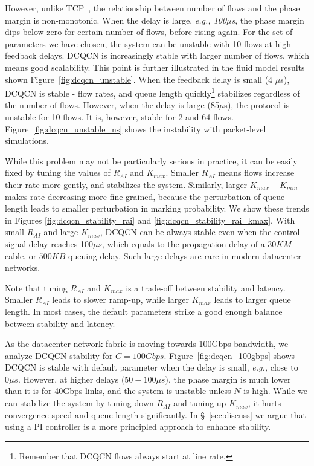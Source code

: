 However, unlike TCP~\cite{misra2000fluid}, the relationship between number of
flows and the phase margin is non-monotonic. When the delay is large, {\em e.g.,
100$\mu$s}, the phase margin dips below zero for certain number of flows, before
rising again.  For the set of parameters we have chosen, the system can be
unstable with 10 flows at high feedback delays.  DCQCN is increasingly stable
with larger number of flows, which means good scalability. This point is further
illustrated in the fluid model results shown Figure~\ref{fig:dcqcn_unstable}.
When the feedback delay is small (4 $\mu$s), DCQCN is stable - flow rates, and
queue length quickly\footnote{Remember that DCQCN flows always start at line
rate.} stabilizes regardless of the number of flows. However, when the delay is
large (85$\mu$s), the protocol is unstable for 10 flows. It is, however, stable
for 2 and 64 flows. Figure~\ref{fig:dcqcn_unstable_ns} shows the instability
with packet-level simulations.

While this problem may not be particularly serious in practice, it can be easily
fixed by tuning the values of $R_{AI}$ and $K_{max}$.  Smaller $R_{AI}$ means
flows increase their rate more gently, and stabilizes the system.  Similarly,
larger $K_{max} - K_{min}$ makes rate decreasing more fine grained, because the
perturbation of queue length leads to smaller perturbation in marking
probability.  We show these trends in Figures \ref{fig:dcqcn_stability_rai} and
\ref{fig:dcqcn_stability_rai_kmax}.  With small $R_{AI}$ and large $K_{max}$,
DCQCN can be always stable even when the control signal delay reaches 100$\mu
s$, which equals to the propagation delay of a $30KM$ cable, or $500KB$ queuing
delay. Such large delays are rare in modern datacenter networks. 

Note that tuning $R_{AI}$ and $K_{max}$ is a trade-off between stability and
latency. Smaller $R_{AI}$ leads to slower ramp-up, while larger $K_{max}$ leads
to larger queue length. In most cases, the default parameters strike a good
enough balance between stability and latency.

  As the datacenter network fabric is moving towards
100Gbps bandwidth, we analyze DCQCN stability for $C=100Gbps$.
Figure~\ref{fig:dcqcn_100gbps} shows DCQCN is stable with default parameter when
the delay is small, {\em e.g.,} close to $0\mu s$. However, at higher delays
($50-100 \mu s$), the phase margin is much lower than it is for 40Gbps links, and
the system is unstable unless $N$ is high. While we can stabilize the system by
tuning down $R_{AI}$ and tuning up $K_{max}$, it hurts convergence speed and
queue length significantly. In \S~\ref{sec:discuss} we argue that using a PI
controller is a more principled approach to enhance stability.
\fi